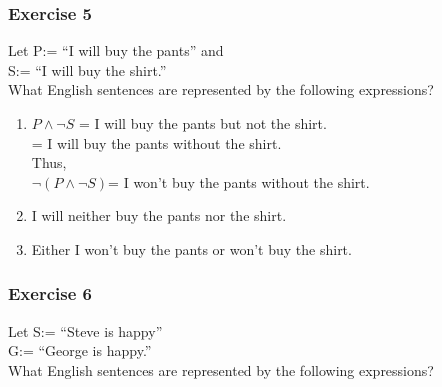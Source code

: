 
\subsubsection{Exercise 5}

\question Let P:= “I will buy the pants” and \\
    S:= “I will buy the shirt.” \\
    What English sentences are represented by the following expressions?
\begin{solution}
    \begin{enumerate}[label=(\alph*)]
        \item $P \wedge \neg S$ = I will buy the pants but not the shirt. \\
                                = I will buy the pants without the shirt. \\
                                Thus, \\
                $\neg (P \wedge \neg S)$= I won't buy the pants without the shirt.
        \item I will neither buy the pants nor the shirt.
        \item Either I won't buy the pants or won't buy the shirt.
    \end{enumerate}
\end{solution}


\subsubsection{Exercise 6}
\question Let S:= “Steve is happy” \\ G:= “George is happy.” \\
What English sentences are represented by the following expressions?

